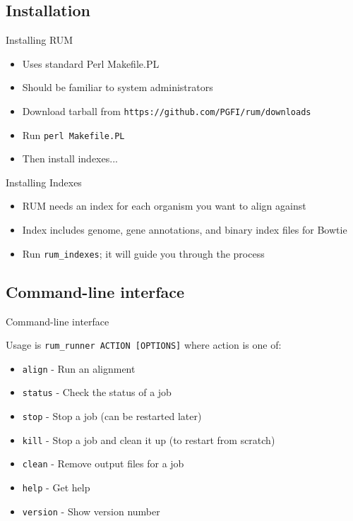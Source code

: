 \documentclass{beamer}
\begin{document}
\subsection{Installation}

\begin{frame}{Installing RUM}
  \begin{itemize}
  \item Uses standard Perl Makefile.PL
  \item Should be familiar to system administrators
  \item Download tarball from \texttt{https://github.com/PGFI/rum/downloads}
  \item Run \texttt{perl Makefile.PL}
  \item Then install indexes...
  \end{itemize}
\end{frame}

\begin{frame}{Installing Indexes}
  \begin{itemize}
  \item RUM needs an index for each organism you want to align against
  \item Index includes genome, gene annotations, and binary index files for Bowtie
  \item Run \texttt{rum\_indexes}; it will guide you through the process
  \end{itemize}
\end{frame}

\subsection{Command-line interface}

\begin{frame}{Command-line interface}

  Usage is \texttt{rum\_runner ACTION [OPTIONS]} where action is one of:

  \begin{itemize}
  \item \texttt{align} - Run an alignment
  \item \texttt{status} - Check the status of a job
  \item \texttt{stop} - Stop a job (can be restarted later)
  \item \texttt{kill} - Stop a job and clean it up (to restart from scratch)
  \item \texttt{clean} - Remove output files for a job
  \item \texttt{help} - Get help
  \item \texttt{version} - Show version number
  \end{itemize}

\end{frame}
\end{document}
